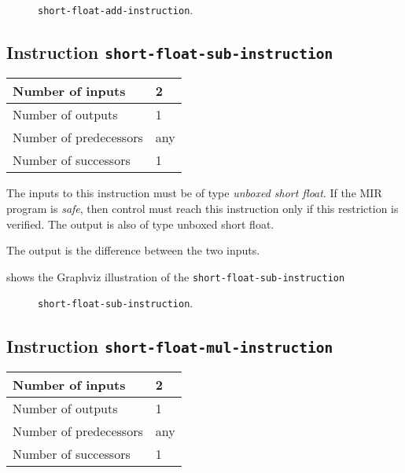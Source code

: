 \begin{figure}
\begin{center}
\end{center}
\caption{\label{fig-short-float-add-instruction}
\texttt{short-float-add-instruction}.}
\end{figure}

\subsection{Instruction \texttt{short-float-sub-instruction}}
\label{mir-instruction-short-float-sub}

\begin{tabular}{|l|l|}
\hline
Number of inputs & 2\\
\hline
Number of outputs & 1\\
\hline
Number of predecessors & any\\
\hline
Number of successors & 1\\
\hline
\end{tabular}

The inputs to this instruction must be of type \emph{unboxed short
  float}.  If the MIR program is \emph{safe}, then control must reach
this instruction only if this restriction is verified.  The output is
also of type unboxed short float.

The output is the difference between the two inputs.

 shows the Graphviz illustration of the
\texttt{short-float-sub-instruction}

\begin{figure}
\begin{center}
\end{center}
\caption{\label{fig-short-float-sub-instruction}
\texttt{short-float-sub-instruction}.}
\end{figure}

\subsection{Instruction \texttt{short-float-mul-instruction}}
\label{mir-instruction-short-float-mul}

\begin{tabular}{|l|l|}
\hline
Number of inputs & 2\\
\hline
Number of outputs & 1\\
\hline
Number of predecessors & any\\
\hline
Number of successors & 1\\
\hline
\end{tabular}

